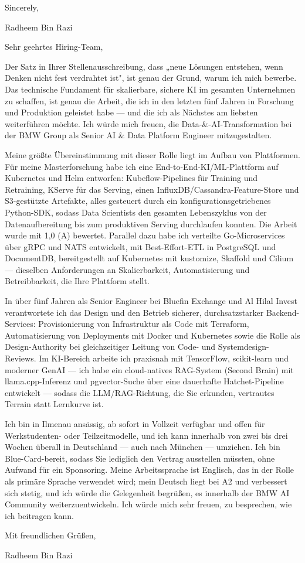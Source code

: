 \documentclass[11pt,a4paper]{coverletter}
\begin{document}
\closing{Sincerely,}{Radheem Bin Razi}

\clearpage
{}


\opening{Sehr geehrtes Hiring-Team,}

Der Satz in Ihrer Stellenausschreibung, dass „neue Lösungen entstehen, wenn Denken nicht fest verdrahtet ist", ist genau der Grund, warum ich mich bewerbe. Das technische Fundament für skalierbare, sichere KI im gesamten Unternehmen zu schaffen, ist genau die Arbeit, die ich in den letzten fünf Jahren in Forschung und Produktion geleistet habe — und die ich als Nächstes am liebsten weiterführen möchte. Ich würde mich freuen, die Data-\&-AI-Transformation bei der BMW Group als Senior AI \& Data Platform Engineer mitzugestalten.

Meine größte Übereinstimmung mit dieser Rolle liegt im Aufbau von Plattformen. Für meine Masterforschung habe ich eine End-to-End-KI/ML-Plattform auf Kubernetes und Helm entworfen: Kubeflow-Pipelines für Training und Retraining, KServe für das Serving, einen InfluxDB/Cassandra-Feature-Store und S3-gestützte Artefakte, alles gesteuert durch ein konfigurationsgetriebenes Python-SDK, sodass Data Scientists den gesamten Lebenszyklus von der Datenaufbereitung bis zum produktiven Serving durchlaufen konnten. Die Arbeit wurde mit 1,0 (A) bewertet. Parallel dazu habe ich verteilte Go-Microservices über gRPC und NATS entwickelt, mit Best-Effort-ETL in PostgreSQL und DocumentDB, bereitgestellt auf Kubernetes mit kustomize, Skaffold und Cilium — dieselben Anforderungen an Skalierbarkeit, Automatisierung und Betreibbarkeit, die Ihre Plattform stellt.

In über fünf Jahren als Senior Engineer bei Bluefin Exchange und Al Hilal Invest verantwortete ich das Design und den Betrieb sicherer, durchsatzstarker Backend-Services: Provisionierung von Infrastruktur als Code mit Terraform, Automatisierung von Deployments mit Docker und Kubernetes sowie die Rolle als Design-Authority bei gleichzeitiger Leitung von Code- und Systemdesign-Reviews. Im KI-Bereich arbeite ich praxisnah mit TensorFlow, scikit-learn und moderner GenAI — ich habe ein cloud-natives RAG-System (Second Brain) mit llama.cpp-Inferenz und pgvector-Suche über eine dauerhafte Hatchet-Pipeline entwickelt — sodass die LLM/RAG-Richtung, die Sie erkunden, vertrautes Terrain statt Lernkurve ist.

Ich bin in Ilmenau ansässig, ab sofort in Vollzeit verfügbar und offen für Werkstudenten- oder Teilzeitmodelle, und ich kann innerhalb von zwei bis drei Wochen überall in Deutschland — auch nach München — umziehen. Ich bin Blue-Card-bereit, sodass Sie lediglich den Vertrag ausstellen müssten, ohne Aufwand für ein Sponsoring. Meine Arbeitssprache ist Englisch, das in der Rolle als primäre Sprache verwendet wird; mein Deutsch liegt bei A2 und verbessert sich stetig, und ich würde die Gelegenheit begrüßen, es innerhalb der BMW AI Community weiterzuentwickeln. Ich würde mich sehr freuen, zu besprechen, wie ich beitragen kann.

\closing{Mit freundlichen Grüßen,}{Radheem Bin Razi}
\end{document}
